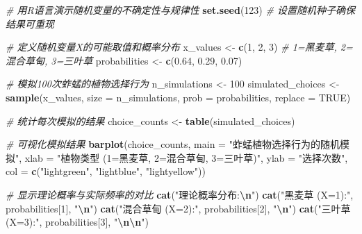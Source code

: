 \documentclass[
  twoside]{book}
\newenvironment{Shaded}{\begin{snugshade}}{\end{snugshade}}
\newcommand{\AttributeTok}[1]{\textcolor[rgb]{0.13,0.29,0.53}{#1}}
\newcommand{\CommentTok}[1]{\textcolor[rgb]{0.56,0.35,0.01}{\textit{#1}}}
\newcommand{\ConstantTok}[1]{\textcolor[rgb]{0.56,0.35,0.01}{#1}}
\newcommand{\DecValTok}[1]{\textcolor[rgb]{0.00,0.00,0.81}{#1}}
\newcommand{\FloatTok}[1]{\textcolor[rgb]{0.00,0.00,0.81}{#1}}
\newcommand{\FunctionTok}[1]{\textcolor[rgb]{0.13,0.29,0.53}{\textbf{#1}}}
\newcommand{\NormalTok}[1]{#1}
\newcommand{\OtherTok}[1]{\textcolor[rgb]{0.56,0.35,0.01}{#1}}
\newcommand{\SpecialCharTok}[1]{\textcolor[rgb]{0.81,0.36,0.00}{\textbf{#1}}}
\newcommand{\StringTok}[1]{\textcolor[rgb]{0.31,0.60,0.02}{#1}}
\begin{document}
\begin{Shaded}
\begin{Highlighting}[]
\CommentTok{\# 用R语言演示随机变量的不确定性与规律性}
\FunctionTok{set.seed}\NormalTok{(}\DecValTok{123}\NormalTok{)  }\CommentTok{\# 设置随机种子确保结果可重现}

\CommentTok{\# 定义随机变量X的可能取值和概率分布}
\NormalTok{x\_values }\OtherTok{\textless{}{-}} \FunctionTok{c}\NormalTok{(}\DecValTok{1}\NormalTok{, }\DecValTok{2}\NormalTok{, }\DecValTok{3}\NormalTok{)  }\CommentTok{\# 1=黑麦草, 2=混合草甸, 3=三叶草}
\NormalTok{probabilities }\OtherTok{\textless{}{-}} \FunctionTok{c}\NormalTok{(}\FloatTok{0.64}\NormalTok{, }\FloatTok{0.29}\NormalTok{, }\FloatTok{0.07}\NormalTok{)}

\CommentTok{\# 模拟100次蚱蜢的植物选择行为}
\NormalTok{n\_simulations }\OtherTok{\textless{}{-}} \DecValTok{100}
\NormalTok{simulated\_choices }\OtherTok{\textless{}{-}} \FunctionTok{sample}\NormalTok{(x\_values, }\AttributeTok{size =}\NormalTok{ n\_simulations,}
                            \AttributeTok{prob =}\NormalTok{ probabilities, }\AttributeTok{replace =} \ConstantTok{TRUE}\NormalTok{)}

\CommentTok{\# 统计每次模拟的结果}
\NormalTok{choice\_counts }\OtherTok{\textless{}{-}} \FunctionTok{table}\NormalTok{(simulated\_choices)}

\CommentTok{\# 可视化模拟结果}
\FunctionTok{barplot}\NormalTok{(choice\_counts,}
        \AttributeTok{main =} \StringTok{"蚱蜢植物选择行为的随机模拟"}\NormalTok{,}
        \AttributeTok{xlab =} \StringTok{"植物类型 (1=黑麦草, 2=混合草甸, 3=三叶草)"}\NormalTok{,}
        \AttributeTok{ylab =} \StringTok{"选择次数"}\NormalTok{,}
        \AttributeTok{col =} \FunctionTok{c}\NormalTok{(}\StringTok{"lightgreen"}\NormalTok{, }\StringTok{"lightblue"}\NormalTok{, }\StringTok{"lightyellow"}\NormalTok{))}

\CommentTok{\# 显示理论概率与实际频率的对比}
\FunctionTok{cat}\NormalTok{(}\StringTok{"理论概率分布:}\SpecialCharTok{\textbackslash{}n}\StringTok{"}\NormalTok{)}
\FunctionTok{cat}\NormalTok{(}\StringTok{"黑麦草 (X=1):"}\NormalTok{, probabilities[}\DecValTok{1}\NormalTok{], }\StringTok{"}\SpecialCharTok{\textbackslash{}n}\StringTok{"}\NormalTok{)}
\FunctionTok{cat}\NormalTok{(}\StringTok{"混合草甸 (X=2):"}\NormalTok{, probabilities[}\DecValTok{2}\NormalTok{], }\StringTok{"}\SpecialCharTok{\textbackslash{}n}\StringTok{"}\NormalTok{)}
\FunctionTok{cat}\NormalTok{(}\StringTok{"三叶草 (X=3):"}\NormalTok{, probabilities[}\DecValTok{3}\NormalTok{], }\StringTok{"}\SpecialCharTok{\textbackslash{}n\textbackslash{}n}\StringTok{"}\NormalTok{)}


\end{Highlighting}
\end{Shaded}
\end{document}
